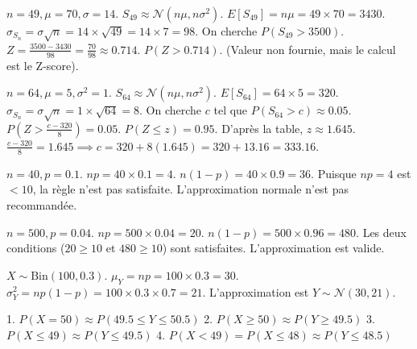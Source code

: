 \begin{correctionbox}
$n=49, \mu=70, \sigma=14$. $S_{49} \approx \mathcal{N}(n\mu, n\sigma^2)$.
$E[S_{49}] = n\mu = 49 \times 70 = 3430$.
$\sigma_{S_n} = \sigma \sqrt{n} = 14 \times \sqrt{49} = 14 \times 7 = 98$.
On cherche $P(S_{49} > 3500)$.
$Z = \frac{3500 - 3430}{98} = \frac{70}{98} \approx 0.714$.
$P(Z > 0.714)$. (Valeur non fournie, mais le calcul est le Z-score).
\end{correctionbox}

\begin{correctionbox}
$n=64, \mu=5, \sigma^2=1$. $S_{64} \approx \mathcal{N}(n\mu, n\sigma^2)$.
$E[S_{64}] = 64 \times 5 = 320$.
$\sigma_{S_n} = \sigma \sqrt{n} = 1 \times \sqrt{64} = 8$.
On cherche $c$ tel que $P(S_{64} > c) \approx 0.05$.
$P(Z > \frac{c - 320}{8}) = 0.05$.
$P(Z \le z) = 0.95$. D'après la table, $z \approx 1.645$.
$\frac{c - 320}{8} = 1.645 \implies c = 320 + 8(1.645) = 320 + 13.16 = 333.16$.
\end{correctionbox}

\begin{correctionbox}
$n=40, p=0.1$.
$np = 40 \times 0.1 = 4$.
$n(1-p) = 40 \times 0.9 = 36$.
Puisque $np=4$ est $< 10$, la règle n'est pas satisfaite. L'approximation normale n'est pas recommandée.
\end{correctionbox}

\begin{correctionbox}
$n=500, p=0.04$.
$np = 500 \times 0.04 = 20$.
$n(1-p) = 500 \times 0.96 = 480$.
Les deux conditions ($20 \ge 10$ et $480 \ge 10$) sont satisfaites. L'approximation est valide.
\end{correctionbox}

\begin{correctionbox}
$X \sim \text{Bin}(100, 0.3)$.
$\mu_Y = np = 100 \times 0.3 = 30$.
$\sigma_Y^2 = np(1-p) = 100 \times 0.3 \times 0.7 = 21$.
L'approximation est $Y \sim \mathcal{N}(30, 21)$.
\end{correctionbox}

\begin{correctionbox}
1. $P(X = 50) \approx P(49.5 \le Y \le 50.5)$
2. $P(X \ge 50) \approx P(Y \ge 49.5)$
3. $P(X \le 49) \approx P(Y \le 49.5)$
4. $P(X < 49) = P(X \le 48) \approx P(Y \le 48.5)$
\end{correctionbox}

